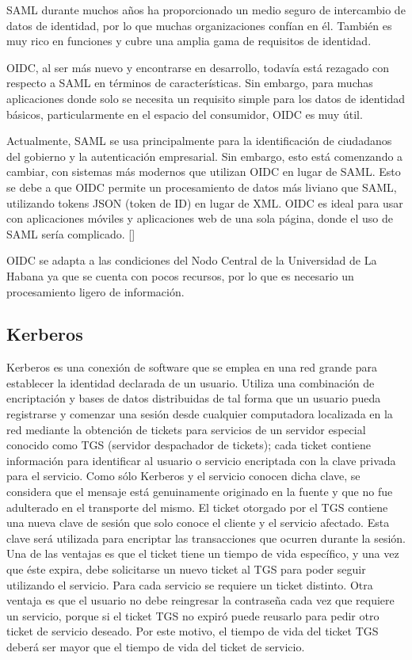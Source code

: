 SAML durante muchos años ha proporcionado un medio seguro de intercambio de datos de identidad, por lo que muchas organizaciones confían en él. También es muy rico en funciones y cubre una amplia gama de requisitos de identidad.


OIDC, al ser más nuevo y encontrarse en desarrollo, todavía está rezagado con respecto a SAML en términos de características. Sin embargo, para muchas aplicaciones donde solo se necesita un requisito simple para los datos de identidad básicos, particularmente en el espacio del consumidor, OIDC es muy útil.

Actualmente, SAML se usa principalmente para la identificación de ciudadanos del gobierno y la autenticación empresarial. Sin embargo, esto está comenzando a cambiar, con sistemas más modernos que utilizan OIDC en lugar de SAML. Esto se debe a que OIDC permite un procesamiento de datos más liviano que SAML, utilizando tokens JSON (token de ID) en lugar de XML. OIDC es ideal para usar con aplicaciones móviles y aplicaciones web de una sola página, donde el uso de SAML sería complicado. [\cite{naik2017securing}]

OIDC se adapta a las condiciones del Nodo Central de la Universidad de La Habana ya que se cuenta con pocos recursos, por lo que es necesario un procesamiento ligero de información. 

\subsection{Kerberos}
Kerberos es una conexión de software que se emplea en una red grande para establecer la identidad declarada de un usuario. Utiliza una combinación de encriptación y bases de datos distribuidas de tal forma que un usuario pueda registrarse y comenzar una sesión desde cualquier computadora localizada en la red mediante la obtención de tickets para servicios de un servidor especial conocido como TGS (servidor despachador de tickets); cada ticket contiene información para identificar al usuario o servicio encriptada con la clave privada para el servicio. Como sólo Kerberos y el servicio conocen dicha clave, se considera que el mensaje está genuinamente originado en la fuente y que no fue adulterado en el transporte del mismo. El ticket otorgado por el TGS contiene una nueva clave de sesión que solo conoce el cliente y el servicio afectado. Esta clave será utilizada para encriptar las transacciones que ocurren durante la sesión.
Una de las ventajas es que el ticket tiene un tiempo de vida específico, y una vez que éste expira, debe solicitarse un nuevo ticket al TGS para poder seguir utilizando el servicio. Para cada servicio se requiere un ticket distinto. Otra ventaja es que el usuario no debe reingresar la contraseña cada vez que requiere un servicio, porque si el ticket TGS no expiró puede reusarlo para pedir otro ticket de servicio deseado. Por este motivo, el tiempo de vida del ticket TGS deberá ser mayor que el tiempo de vida del ticket de servicio.


